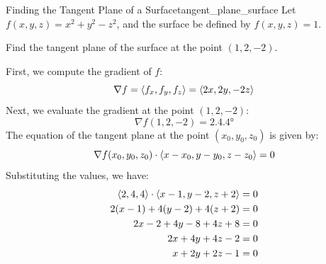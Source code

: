 \begin{problem}{Finding the Tangent Plane of a Surface}{tangent_plane_surface}
Let $f(x, y, z) = x^2 + y^2 - z^2$, and the surface be defined by $f(x, y, z) = 1$. 

Find the tangent plane of the surface at the point $(1, 2, -2)$.
\end{problem}

\begin{sol}
\begin{center}
\end{center}

First, we compute the gradient of $f$:
\[
    \nabla f = \left\langle f_x, f_y, f_z \right\rangle = \left\langle 2x, 2y, -2z \right\rangle
\]
Next, we evaluate the gradient at the point $(1, 2, -2)$:
\[
    \nabla f(1, 2, -2) = \ang{2, 4, 4}
\]
The equation of the tangent plane at the point $(x_0, y_0, z_0)$ is given by:
\[
    \nabla f(x_0, y_0, z_0) \cdot \left\langle x - x_0, y - y_0, z - z_0 \right\rangle = 0
\]
Substituting the values, we have:
\begin{align*}
    \left\langle 2, 4, 4 \right\rangle \cdot \left\langle x - 1, y - 2, z + 2 \right\rangle &= 0 \\
    2(x - 1) + 4(y - 2) + 4(z + 2) &= 0 \\
    2x - 2 + 4y - 8 + 4z + 8 &= 0 \\
    2x + 4y + 4z - 2 &= 0 \\
    x + 2y + 2z - 1 &= 0
\end{align*}
\end{sol}

